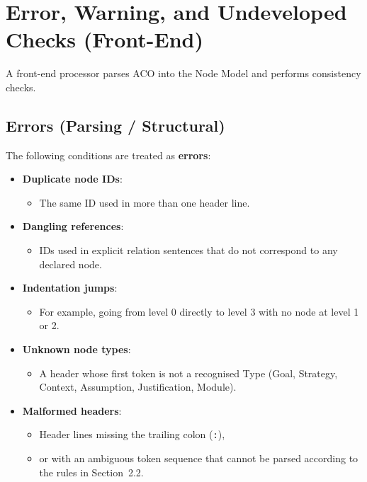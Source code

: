 \documentclass[11pt]{article}
\begin{document}
\section{Error, Warning, and Undeveloped Checks (Front-End)}
\label{sec:errors}

A front-end processor parses ACO into the Node Model and performs consistency checks.

\subsection{Errors (Parsing / Structural)}

The following conditions are treated as \textbf{errors}:

\begin{itemize}[leftmargin=2em]
  \item \textbf{Duplicate node IDs}:
  \begin{itemize}[leftmargin=1.5em]
    \item The same ID used in more than one header line.
  \end{itemize}

  \item \textbf{Dangling references}:
  \begin{itemize}[leftmargin=1.5em]
    \item IDs used in explicit relation sentences that do not correspond to any declared node.
  \end{itemize}

  \item \textbf{Indentation jumps}:
  \begin{itemize}[leftmargin=1.5em]
    \item For example, going from level 0 directly to level 3 with no node at level 1 or 2.
  \end{itemize}

  \item \textbf{Unknown node types}:
  \begin{itemize}[leftmargin=1.5em]
    \item A header whose first token is not a recognised Type (Goal, Strategy, Context, Assumption, Justification, Module).
  \end{itemize}

  \item \textbf{Malformed headers}:
  \begin{itemize}[leftmargin=1.5em]
    \item Header lines missing the trailing colon (\texttt{:}),
    \item or with an ambiguous token sequence that cannot be parsed according to the rules in Section~2.2.
  \end{itemize}
\end{itemize}
\end{document}

